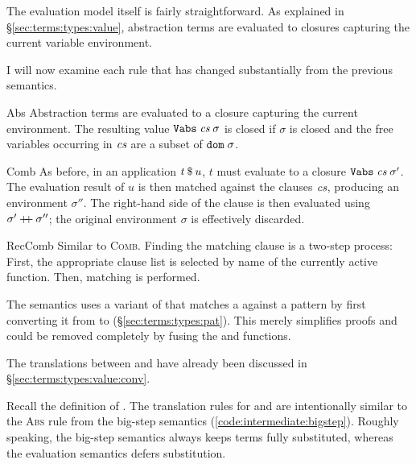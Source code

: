 The evaluation model itself is fairly straightforward.
As explained in §\ref{sec:terms:types:value}, abstraction terms are evaluated to closures capturing the current variable environment.

I will now examine each rule that has changed substantially from the previous semantics.

\begin{semantics}
  \item[Abs]
    Abstraction terms are evaluated to a closure capturing the current environment.
    The resulting value $\texttt{\textup{Vabs}}\;\textit{cs}\;\sigma$ is closed if $\sigma$ is closed and the free variables occurring in $\textit{cs}$ are a subset of $\texttt{\textup{dom}}\;\sigma$.
  \item[Comb]
    As before, in an application $t\mathbin{\$}u$, $t$ must evaluate to a closure $\texttt{\textup{Vabs}}\;\textit{cs}\;\sigma'$.
    The evaluation result of $u$ is then matched against the clauses $\textit{cs}$, producing an environment $\sigma''$.
    The right-hand side of the clause is then evaluated using $\sigma' \mathbin{+\!\!+} \sigma''$; the original environment $\sigma$ is effectively discarded.
  \item[RecComb]
    Similar to \textsc{Comb}.
    Finding the matching clause is a two-step process:
    First, the appropriate clause list is selected by name of the currently active function.
    Then, matching is performed.
\end{semantics}


\noindent
The semantics uses a variant of  that matches a  against a pattern by first converting it from  to  (§\ref{sec:terms:types:pat}).
This merely simplifies proofs and could be removed completely by fusing the  and  functions.

The translations between  and  have already been discussed in §\ref{sec:terms:types:value:conv}.

Recall the definition of .
The translation rules for  and  are intentionally similar to the \textsc{Abs} rule from the big-step semantics (\cref{code:intermediate:bigstep}).
Roughly speaking, the big-step semantics always keeps terms fully substituted, whereas the evaluation semantics defers substitution.

